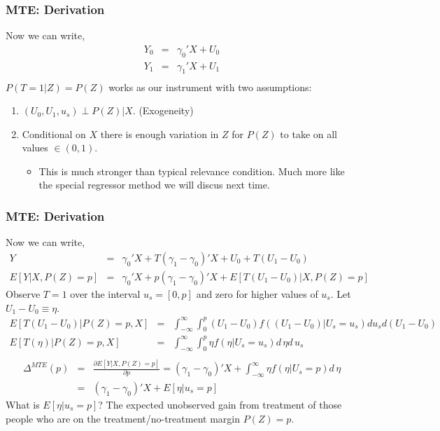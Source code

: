 \documentclass[xcolor=pdftex,dvipsnames,table,mathserif,aspectratio=169]{beamer}
\begin{document}
\begin{frame}
\frametitle{MTE: Derivation}
Now we can write,
\begin{eqnarray*}
Y_0 &=& \gamma_0' X + U_0\\
Y_1 &=& \gamma_1' X + U_1\\
\end{eqnarray*}
$P(T=1 | Z) = P(Z)$ works as our instrument with two assumptions:
\begin{enumerate}
\item $(U_0, U_1, u_s) \perp P(Z) | X$. (Exogeneity)
\item Conditional on $X$ there is enough variation in $Z$ for $P(Z)$ to take on all values $\in(0,1)$.
\begin{itemize}
\item This is much stronger than typical \alert{relevance} condition. Much more like the \alert{special regressor} method we will discus next time.
\end{itemize}
\end{enumerate}
\end{frame}

\begin{frame}
\frametitle{MTE: Derivation}
\footnotesize
Now we can write,
\begin{eqnarray*}
Y &=& \gamma_0' X + T(\gamma_1 - \gamma_0)' X + U_0 + T(U_1 - U_0)\\
E[Y| X,P(Z)=p] &=& \gamma_0' X + p(\gamma_1 - \gamma_0)'X + E[T(U_1 - U_0)|X,P(Z)=p]
\end{eqnarray*}
Observe $T=1$ over the interval $u_s = [0,p]$ and zero for higher values of $u_s$. Let $U_1-U_0 \equiv \eta$.
\begin{eqnarray*}
E[T(U_1 - U_0) | P(Z) =p,X] &=& \int_{-\infty}^{\infty} \int_{0}^{p} (U_1 - U_0) f((U_1-U_0) | U_s = u_s) d u_s d(U_1 -U_0)\\
E[T(\eta) | P(Z) =p,X] &=& \int_{-\infty}^{\infty} \int_{0}^{p} \eta f(\eta | U_s = u_s)  d\, \eta d\, u_s\\
\end{eqnarray*}
\begin{eqnarray*}
\Delta^{MTE}(p) &=& \frac{\partial E[Y | X, P(Z)=p]}{\partial p} = (\gamma_1 - \gamma_0)'X + \int_{-\infty}^{\infty} \eta f(\eta | U_s =p) d\, \eta\\
&=& (\gamma_1 - \gamma_0)'X + E[\eta | u_s =p]
\end{eqnarray*}
What is $E[\eta | u_s =p]$? The expected unobserved gain from treatment of those people who are on the treatment/no-treatment margin $P(Z)=p$.
\end{frame}
\end{document}
